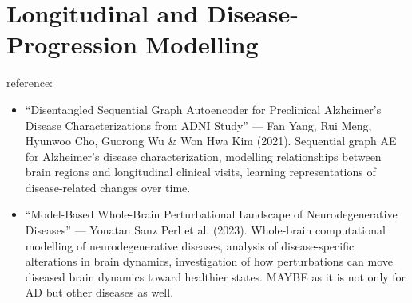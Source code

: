\section{Longitudinal and Disease-Progression Modelling}

reference:
\begin{itemize}
    \item “Disentangled Sequential Graph Autoencoder for Preclinical Alzheimer's Disease Characterizations from ADNI Study” — Fan Yang, Rui Meng, Hyunwoo Cho, Guorong Wu \& Won Hwa Kim (2021). Sequential graph AE for Alzheimer's disease characterization, modelling relationships between brain regions and longitudinal clinical visits, learning representations of disease-related changes over time.
    \item “Model-Based Whole-Brain Perturbational Landscape of Neurodegenerative Diseases” — Yonatan Sanz Perl et al. (2023). Whole-brain computational modelling of neurodegenerative diseases, analysis of disease-specific alterations in brain dynamics, investigation of how perturbations can move diseased brain dynamics toward healthier states. MAYBE as it is not only for AD but other diseases as well.    
\end{itemize}
